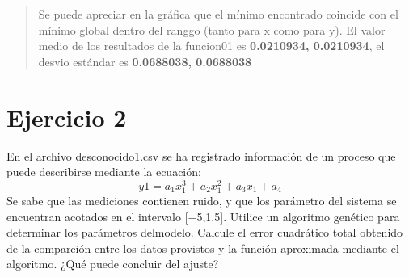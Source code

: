 \documentclass[]{book}
\begin{document}
\begin{quote}
Se puede apreciar en la gráfica que el mínimo encontrado coincide con el mínimo global dentro del ranggo (tanto para x como para y).
El valor medio de los resultados de la funcion01 es \textbf{0.0210934, 0.0210934}, el desvio estándar es \textbf{0.0688038, 0.0688038}
\end{quote}

\hypertarget{ejercicio-2-2}{%
\section{Ejercicio 2}\label{ejercicio-2-2}}

En el archivo desconocido1.csv se ha registrado información de un proceso que puede describirse mediante la ecuación:
\[y1 = a_1x^3_1 + a_2 x^2_1 + a_3 x_1 + a_4\]
Se sabe que las mediciones contienen ruido, y que los parámetro del sistema se encuentran acotados en el intervalo {[}−5,1.5{]}.
Utilice un algoritmo genético para determinar los parámetros delmodelo. Calcule el error cuadrático total obtenido de la comparción entre los datos provistos y la función aproximada mediante el algoritmo. ¿Qué puede concluir del ajuste?


\end{document}
